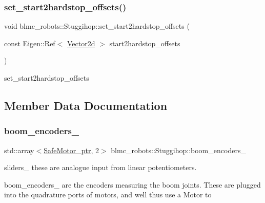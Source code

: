 \subsubsection{\texorpdfstring{set\+\_\+start2hardstop\+\_\+offsets()}{set\_start2hardstop\_offsets()}}
{\footnotesize\ttfamily void blmc\+\_\+robots\+::\+Stuggihop\+::set\+\_\+start2hardstop\+\_\+offsets (\begin{DoxyParamCaption}\item[{const Eigen\+::\+Ref$<$ \hyperlink{common__header_8hpp_acb6916bc8c9fe9d98c484fd4cc201447}{Vector2d} $>$}]{start2hardstop\+\_\+offsets }\end{DoxyParamCaption})}



set\+\_\+start2hardstop\+\_\+offsets 



\subsection{Member Data Documentation}
\mbox{\label{classblmc__robots_1_1Stuggihop_a5c96c061e050c6b89175ea64ca718fcb}} 
\subsubsection{\texorpdfstring{boom\+\_\+encoders\+\_\+}{boom\_encoders\_}}
{\footnotesize\ttfamily std\+::array$<$\hyperlink{common__header_8hpp_a9850cf917156e20846aef3f8195aea0f}{Safe\+Motor\+\_\+ptr}, 2$>$ blmc\+\_\+robots\+::\+Stuggihop\+::boom\+\_\+encoders\+\_\+\hspace{0.3cm}{\ttfamily [private]}}



sliders\+\_\+ these are analogue input from linear potentiometers. 

boom\+\_\+encoders\+\_\+ are the encoders measuring the boom joints. These are plugged into the quadrature ports of motors, and we\textquotesingle{}ll thus use a Motor to \mbox{\label{classblmc__robots_1_1Stuggihop_a84f6ffe6ea3058bb908a4915e040e936}} 
